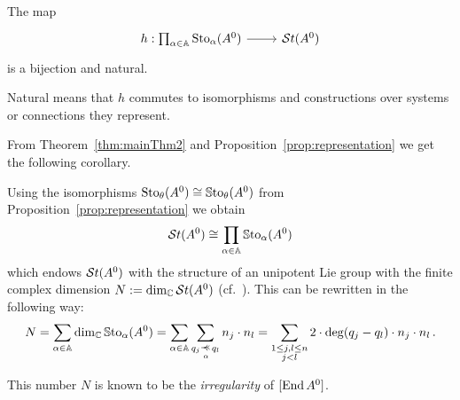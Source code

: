 \begin{center}
  \begin{minipage}[t]{0.8\textwidth}
    \begin{tthm}\label{thm:mainThm2}
      The map
      \[ \begin{tikzcd}
          h:\prod_{\alpha\in\A}\Sto_\alpha(A^0) \rar& \St(A^0)
      \end{tikzcd} \]
      is a bijection and natural.
      \begin{s-rem}
        Natural means that $h$ commutes to isomorphisms and constructions over
        systems or connections they represent.
      \end{s-rem}
    \end{tthm}
  \end{minipage}
\end{center}
From Theorem~\ref{thm:mainThm2} and Proposition~\ref{prop:representation} we
get the following corollary.
\begin{cor}\label{cor:isomToChochN}
  Using the isomorphisms $\operatorname{Sto}_\theta(A^0)\cong\operatorname{\mathbb{S}to}_\theta(A^0)$ from
  Proposition~\ref{prop:representation} we obtain
  \[
    \mathcal{S}{}t(A^0) \cong \prod_{\alpha\in\mathbb{A}}\operatorname{\mathbb{S}to}_\alpha(A^0)
  \]
  which endows $\mathcal{S}{}t(A^0)$ with the structure of an unipotent Lie group with the
  finite complex dimension $N:=\dim_\mathbb{C}\mathcal{S}{}t(A^0)$
  (cf.~\cite[Sec.III.1]{Loday1994}).
  This can be rewritten in the following way:
  \[
    N=\sum_{\alpha\in\A}\dim_\C\SSto_\alpha(A^0)
      =\sum_{\alpha\in\A}\sum_{q_j\myrel{\alpha}q_l}n_j\cdot n_l
      =\sum_{\substack{1\leq j,l\leq n\\j<l}}2\cdot\deg(q_j-q_l)\cdot
        n_j\cdot n_l \,.
  \]
  \begin{s-rem}
    This number $N$ is known to be the \emph{irregularity} of $[\operatorname{End} A^0]$.
  \end{s-rem}
\end{cor}
\begin{comment}
  \marginnote{\cite[880f]{Loday1994}}
  We have also two structures of a linear affine variety on the set $\St(A^0)$.
  \begin{rem}
    Let $\sto_\alpha(A^0)$ be the Lie algebra corresponding to
    $\Sto_\alpha(A^0)$. The exponential map\footnote{This is not the map $\exp$
    from Section~\ref{sec:mainThm1}.} induces an homomorphism
    $\exp:\sto_\alpha(A^0)\to\Sto_\alpha(A^0)$ and denote by $\ln=\exp^{-1}$
    the inverse map.
    \begin{enumerate}
      \item The \emph{tangent linear structure} is defined as \TODO
      \item Using the map
        \begin{align*}
          \sto_{\alpha}(A^0) &\overset{\id+\cdot}\longrightarrow
          \Sto_{\alpha}(A^0)
        \\\dot{f}_\alpha & \longmapsto \id+\dot{f}_\alpha \,.
        \end{align*}
    \end{enumerate}
  \end{rem}
\end{comment}

